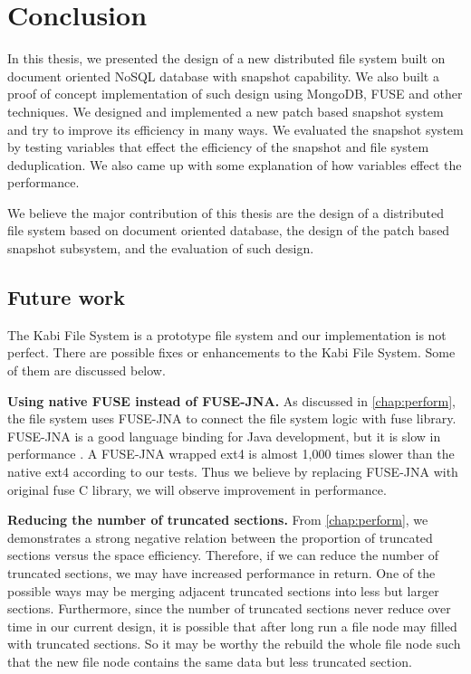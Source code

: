 \chapter{Conclusion}
\label{chap:conclusion}

    In this thesis, we presented the design of a new distributed file system built on document oriented NoSQL database with snapshot capability. We also built a proof of concept implementation of such design using MongoDB, FUSE and other techniques. We designed and implemented a new patch based snapshot system and try to improve its efficiency in many ways. We evaluated the snapshot system by testing variables that effect the efficiency of the snapshot and file system deduplication. We also came up with some explanation of how variables effect the performance.

    We believe the major contribution of this thesis are the design of a distributed file system based on document oriented database, the design of the patch based snapshot subsystem, and the evaluation of such design.

\section{Future work}

    The Kabi File System is a prototype file system and our implementation is not perfect. There are possible fixes or enhancements to the Kabi File System. Some of them are discussed below.
    
    \textbf{Using native FUSE instead of FUSE-JNA.} As discussed in \cref{chap:perform}, the file system uses FUSE-JNA to connect the file system logic with fuse library. FUSE-JNA is a good language binding for Java development, but it is slow in performance \cite{fusejna}. A FUSE-JNA wrapped ext4 is almost 1,000 times slower than the native ext4 according to our tests. Thus we believe by replacing FUSE-JNA with original fuse C library, we will observe improvement in performance.

    \textbf{Reducing the number of truncated sections.} From \cref{chap:perform}, we demonstrates a strong negative relation between the proportion of truncated sections versus the space efficiency. Therefore, if we can reduce the number of truncated sections, we may have increased performance in return. One of the possible ways may be merging adjacent truncated sections into less but larger sections. Furthermore, since the number of truncated sections never reduce over time in our current design, it is possible that after long run a file node may filled with truncated sections. So it may be worthy the rebuild the whole file node such that the new file node contains the same data but less truncated section.
    

